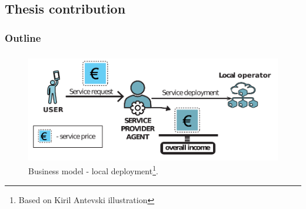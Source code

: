 \documentclass[aspectratio=169]{beamer}
\begin{document}
\subsection{Thesis contribution}
\begin{frame}
    \frametitle{Outline}
    \tableofcontents[subsectionstyle=show/shaded/hide,sectionstyle=show/shaded]
\end{frame}


\begin{frame}
    \frametitle{\secname}
    \framesubtitle{\subsecname}

    \begin{figure}
        \centering
        \includegraphics[width=.8\textwidth]{img/local-deploy.pdf}
        \caption{Business model - local deployment\footnote{Based on Kiril Antevski illustration}.}
        \label{fig:local-deploy}
    \end{figure}
\end{frame}
\end{document}
